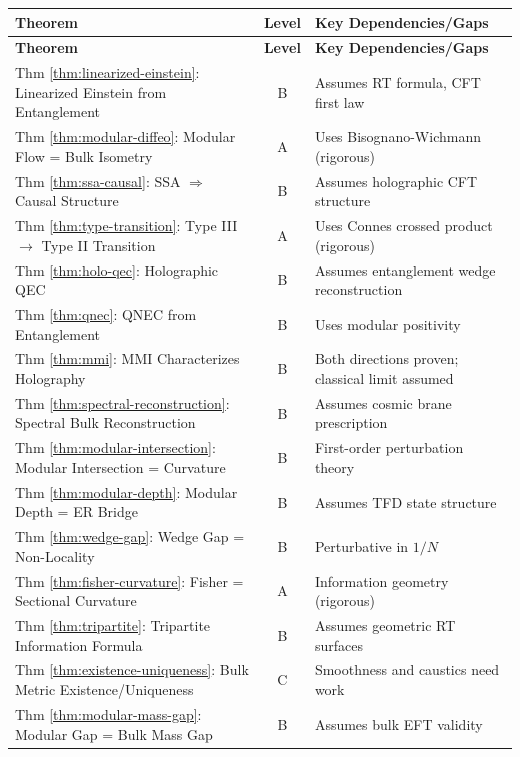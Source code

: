 \documentclass[12pt,a4paper]{article}
\begin{document}
\begin{center}
\renewcommand{\arraystretch}{1.3}
\begin{longtable}{|p{5.5cm}|c|p{6cm}|}
\hline
\textbf{Theorem} & \textbf{Level} & \textbf{Key Dependencies/Gaps} \\
\hline
\endfirsthead
\hline
\textbf{Theorem} & \textbf{Level} & \textbf{Key Dependencies/Gaps} \\
\hline
\endhead
\hline
\endfoot
\hline
\endlastfoot

Thm \ref{thm:linearized-einstein}: Linearized Einstein from Entanglement & B & Assumes RT formula, CFT first law \\
\hline
Thm \ref{thm:modular-diffeo}: Modular Flow = Bulk Isometry & A & Uses Bisognano-Wichmann (rigorous) \\
\hline
Thm \ref{thm:ssa-causal}: SSA $\Rightarrow$ Causal Structure & B & Assumes holographic CFT structure \\
\hline
Thm \ref{thm:type-transition}: Type III $\to$ Type II Transition & A & Uses Connes crossed product (rigorous) \\
\hline
Thm \ref{thm:holo-qec}: Holographic QEC & B & Assumes entanglement wedge reconstruction \\
\hline
Thm \ref{thm:qnec}: QNEC from Entanglement & B & Uses modular positivity \\
\hline
Thm \ref{thm:mmi}: MMI Characterizes Holography & B & Both directions proven; classical limit assumed \\
\hline
Thm \ref{thm:spectral-reconstruction}: Spectral Bulk Reconstruction & B & Assumes cosmic brane prescription \\
\hline
Thm \ref{thm:modular-intersection}: Modular Intersection = Curvature & B & First-order perturbation theory \\
\hline
Thm \ref{thm:modular-depth}: Modular Depth = ER Bridge & B & Assumes TFD state structure \\
\hline
Thm \ref{thm:wedge-gap}: Wedge Gap = Non-Locality & B & Perturbative in $1/N$ \\
\hline
Thm \ref{thm:fisher-curvature}: Fisher = Sectional Curvature & A & Information geometry (rigorous) \\
\hline
Thm \ref{thm:tripartite}: Tripartite Information Formula & B & Assumes geometric RT surfaces \\
\hline
Thm \ref{thm:existence-uniqueness}: Bulk Metric Existence/Uniqueness & C & Smoothness and caustics need work \\
\hline
Thm \ref{thm:modular-mass-gap}: Modular Gap = Bulk Mass Gap & B & Assumes bulk EFT validity \\

\end{longtable}
\end{center}
\end{document}
